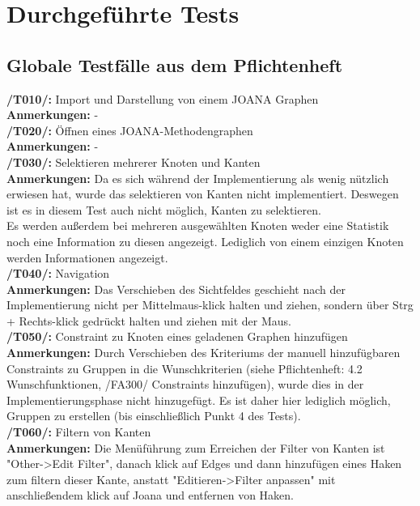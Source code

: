 \chapter{Durchgeführte Tests}
\label{ch:durchgefuehrtetests}

\section{Globale Testfälle aus dem Pflichtenheft}

\textbf{/T010/: }Import und Darstellung von einem JOANA Graphen\\
\textbf{Anmerkungen: }-\\

\textbf{/T020/: }Öffnen eines JOANA-Methodengraphen\\
\textbf{Anmerkungen: }-\\

\textbf{/T030/: }Selektieren mehrerer Knoten und Kanten\\
\textbf{Anmerkungen: }Da es sich während der Implementierung als wenig nützlich erwiesen hat, wurde das selektieren von Kanten nicht implementiert. Deswegen ist es in diesem Test auch nicht möglich, Kanten zu selektieren.\\
	Es werden außerdem bei mehreren ausgewählten Knoten weder eine Statistik noch eine Information zu diesen angezeigt. Lediglich von einem einzigen Knoten werden Informationen angezeigt.\\

\textbf{/T040/: }Navigation\\
\textbf{Anmerkungen: }Das Verschieben des Sichtfeldes geschieht nach der Implementierung nicht per Mittelmaus-klick halten und ziehen, sondern über Strg + Rechts-klick gedrückt halten und ziehen mit der Maus.\\

\textbf{/T050/: }Constraint zu Knoten eines geladenen Graphen hinzufügen\\
\textbf{Anmerkungen: }Durch Verschieben des Kriteriums der manuell hinzufügbaren Constraints zu Gruppen in die Wunschkriterien (siehe Pflichtenheft: 4.2 Wunschfunktionen, /FA300/ Constraints hinzufügen), wurde dies in der Implementierungsphase nicht hinzugefügt. Es ist daher hier lediglich möglich, Gruppen zu erstellen (bis einschließlich Punkt 4 des Tests).\\

\textbf{/T060/: }Filtern von Kanten\\
\textbf{Anmerkungen: }Die Menüführung zum Erreichen der Filter von Kanten ist "Other->Edit Filter", danach klick auf Edges und dann hinzufügen eines Haken zum filtern dieser Kante, anstatt "Editieren->Filter anpassen" mit anschließendem klick auf Joana und entfernen von Haken.\\


